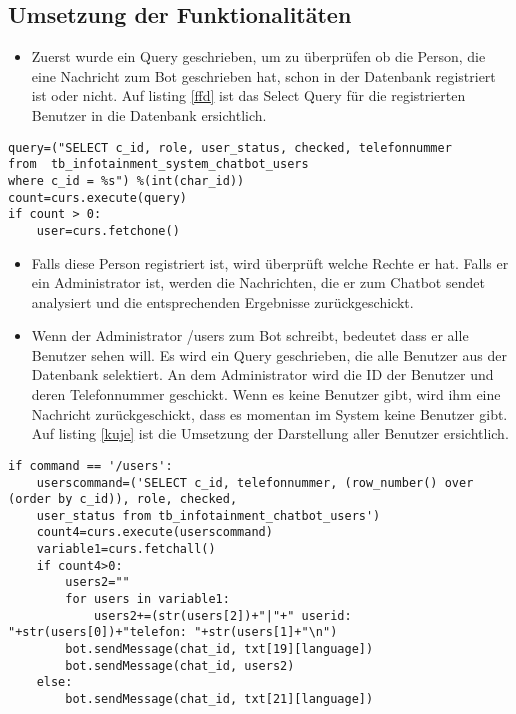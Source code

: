 \subsection{Umsetzung der Funktionalitäten}
\begin{itemize}
	\item Zuerst wurde ein Query geschrieben, um zu überprüfen ob die Person, die eine Nachricht zum Bot geschrieben hat, schon in der Datenbank registriert ist oder nicht. Auf listing \ref{ffd} ist das Select Query für die registrierten Benutzer in die Datenbank ersichtlich.
\end{itemize} 
\begin{lstlisting}[frame=single]
query=("SELECT c_id, role, user_status, checked, telefonnummer 
from  tb_infotainment_system_chatbot_users 
where c_id = %s") %(int(char_id))
count=curs.execute(query)
if count > 0:
	user=curs.fetchone()
\end{lstlisting}
\label{ffd}
\begin{itemize}
	\item Falls diese Person registriert ist, wird überprüft welche Rechte er hat. Falls er ein Administrator ist, werden die Nachrichten, die er zum Chatbot sendet analysiert und die entsprechenden Ergebnisse zurückgeschickt. 
\end{itemize}	
\begin{itemize}
	\item Wenn der Administrator /users zum Bot schreibt, bedeutet dass er alle Benutzer sehen will. Es wird ein Query geschrieben, die alle Benutzer aus der Datenbank selektiert. An dem Administrator wird die ID der Benutzer und deren Telefonnummer geschickt. Wenn es keine Benutzer gibt, wird ihm eine Nachricht zur\"uckgeschickt, dass es momentan im System keine Benutzer gibt. Auf listing \ref{kuje} ist die Umsetzung der Darstellung aller Benutzer ersichtlich. 
\end{itemize}
\begin{lstlisting}[frame=single]
if command == '/users':
	userscommand=('SELECT c_id, telefonnummer, (row_number() over (order by c_id)), role, checked,
	user_status from tb_infotainment_chatbot_users')
	count4=curs.execute(userscommand)
	variable1=curs.fetchall()
	if count4>0:
		users2=""
		for users in variable1:
			users2+=(str(users[2])+"|"+" userid: "+str(users[0])+"telefon: "+str(users[1]+"\n")
		bot.sendMessage(chat_id, txt[19][language])
		bot.sendMessage(chat_id, users2)
	else:
		bot.sendMessage(chat_id, txt[21][language])
	
\end{lstlisting}
